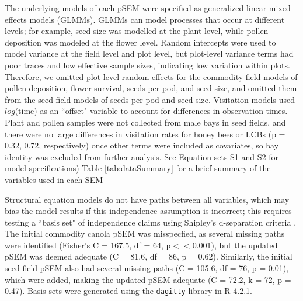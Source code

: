 \documentclass[12pt]{article} %
\begin{document}
The underlying models of each pSEM were specified as generalized linear mixed-effects models (GLMMs).
GLMMs can model processes that occur at different levels; for example, seed size was modelled at the plant level, while pollen deposition was modeled at the flower level.
Random intercepts were used to model variance at the field level and plot level, but plot-level variance terms had poor traces and low effective sample sizes, indicating low variation within plots.
Therefore, we omitted plot-level random effects for the commodity field models of pollen deposition, flower survival, seeds per pod, and seed size, and omitted them from the seed field models of seeds per pod and seed size.
Visitation models used $log$(time) as an ``offset" variable to account for differences in observation times.
Plant and pollen samples were not collected from male bays in seed fields, and there were no large differences in visitation rates for honey bees or LCBs (p = 0.32, 0.72, respectively) once other terms were included as covariates, so bay identity was excluded from further analysis.
See Equation sets S1 and S2 for model specifications) Table \ref{tab:dataSummary} for a brief summary of the variables used in each SEM

Structural equation models do not have paths between all variables, which may bias the model results if this independence assumption is incorrect; this requires testing a ``basis set" of independence claims using Shipley's d-separation criteria \citep{shipley2000, shipley2009}.
The initial commodity canola pSEM was misspecfied, as several missing paths were identified (Fisher's C = 167.5, df = 64, p$<<$0.001), but the updated pSEM was deemed adequate (C = 81.6, df = 86, p = 0.62).
Similarly, the initial seed field pSEM also had several missing paths (C = 105.6, df = 76, p = 0.01), which were added, making the updated pSEM adequate (C = 72.2, k = 72, p = 0.47).
Basis sets were generated using the \texttt{dagitty} library in R 4.2.1.
\end{document}
